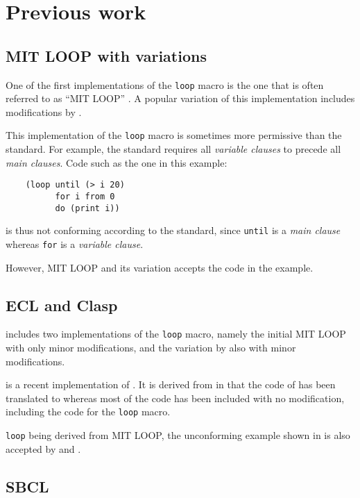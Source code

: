 \section{Previous work}

\subsection{MIT LOOP with variations}
\label{sec-mit-loop}

One of the first implementations of the \commonlisp{} \texttt{loop}
macro is the one that is often referred to as ``MIT LOOP''
\cite{Burke:Moon:MIT.loop}.  A popular variation of this
implementation includes modifications by \symbolics{}.

This implementation of the \texttt{loop} macro is sometimes more
permissive than the \commonlisp{} standard.  For example, the standard
requires all \emph{variable clauses} to precede all \emph{main
  clauses}.  Code such as the one in this example:

\begin{verbatim}
    (loop until (> i 20)
          for i from 0
          do (print i))
\end{verbatim}

\noindent
is thus not conforming according to the standard, since \texttt{until}
is a \emph{main clause} whereas \texttt{for} is a \emph{variable
  clause}.

However, MIT LOOP and its variation accepts the code in the example.

\subsection{ECL and Clasp}

\ecl{} includes two implementations of the \texttt{loop} macro, namely
the initial MIT LOOP with only minor modifications, and the variation
by \symbolics{} also with minor modifications.

\clasp{} is a recent implementation of \commonlisp{}.  It is derived
from \ecl{} in that the \clanguage{} code of \ecl{} has been
translated to \cplusplus{} whereas most of the \commonlisp{} code has
been included with no modification, including the code for the
\texttt{loop} macro.

\ecl{} \texttt{loop} being derived from MIT LOOP, the unconforming
example shown in  is also accepted by \ecl{} and
\clasp{}.

\subsection{SBCL}

